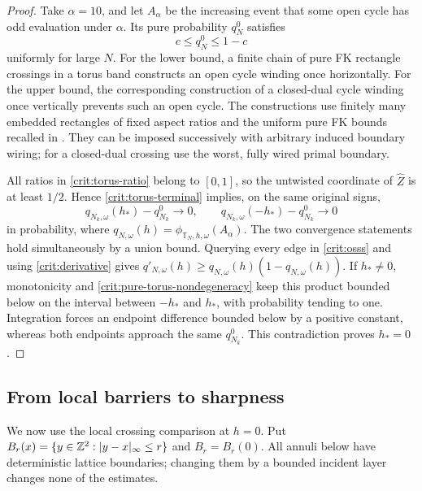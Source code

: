 \begin{proof}
Take $\alpha=10$, and let $A_\alpha$ be the increasing event that some
open cycle has odd evaluation under $\alpha$. Its pure probability
$q_N^0$ satisfies
\begin{equation}
 c\le q_N^0\le1-c
 \label{crit:pure-torus-nondegeneracy}
\end{equation}
uniformly for large $N$. For the lower bound, a finite chain of pure FK
rectangle crossings in a torus band constructs an open cycle winding
once horizontally. For the upper bound, the corresponding construction
of a closed-dual cycle winding once vertically prevents such an open
cycle. The constructions use finitely many embedded rectangles of fixed
aspect ratios and the uniform pure FK bounds recalled in
\cite[Section~2, ``Pure buffered RSW consequences'']{S}.
They can be imposed successively with arbitrary induced boundary wiring;
for a closed-dual crossing use the worst, fully wired primal boundary.

All ratios in \eqref{crit:torus-ratio} belong to $[0,1]$, so the
untwisted coordinate of $\widehat Z$ is at least $1/2$. Hence
\eqref{crit:torus-terminal} implies, on the same original signs,
\[
 q_{N_k,\omega}(h_*)-q_{N_k}^0\longrightarrow0,
 \qquad
 q_{N_k,\omega}(-h_*)-q_{N_k}^0\longrightarrow0
\]
in probability, where $q_{N,\omega}(h)=
\phi_{\mathbb T_N,h,\omega}(A_\alpha)$. The two convergence statements
hold simultaneously by a union bound. Querying every edge in
\eqref{crit:osss} and using \eqref{crit:derivative} gives
$q'_{N,\omega}(h)\ge q_{N,\omega}(h)(1-q_{N,\omega}(h))$.
If $h_*\ne0$, monotonicity and
\eqref{crit:pure-torus-nondegeneracy} keep this product bounded below on
the interval between $-h_*$ and $h_*$, with probability tending to one.
Integration forces an endpoint difference bounded below by a positive
constant, whereas both endpoints approach the same $q_{N_k}^0$.
This contradiction proves $h_*=0$.
\end{proof}

\subsection{From local barriers to sharpness}

We now use the local crossing comparison at $h=0$. Put
$B_r(x)=\{y\in\mathbb Z^2:|y-x|_\infty\le r\}$ and $B_r=B_r(0)$.
All annuli below have deterministic lattice boundaries; changing them by
a bounded incident layer changes none of the estimates.

